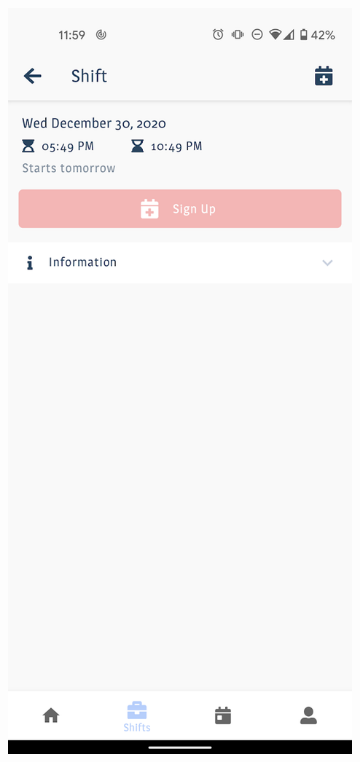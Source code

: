 \documentclass[twoside]{ctuthesis}
\begin{document}
\begin{figure}[ht]
	\centering
	\begin{subfigure}{.5\textwidth}
		\centering
		\includegraphics[width=.9\linewidth]{img/uc9a.png}
		\label{uc9a}
	\end{subfigure}%

\end{figure}
\end{document}
